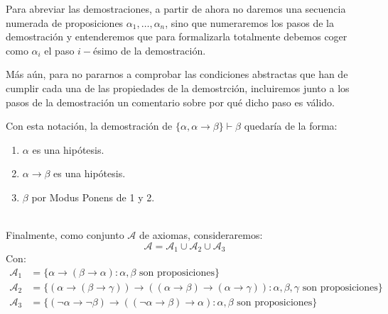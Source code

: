 \begin{notacion}
    Para abreviar las demostraciones, a partir de ahora no daremos una secuencia numerada de proposiciones $\alpha_1,\ldots,\alpha_n$, sino que numeraremos los pasos de la demostración y entenderemos que para formalizarla totalmente debemos coger como $\alpha_i$ el paso $i-$ésimo de la demostración.

    Más aún, para no pararnos a comprobar las condiciones abstractas que han de cumplir cada una de las propiedades de la demostrción, incluiremos junto a los pasos de la demostración un comentario sobre por qué dicho paso es válido.

    Con esta notación, la demostración de $\{\alpha,\alpha\to\beta\}\vdash \beta$ quedaría de la forma:
    \begin{enumerate}
        \item $\alpha$ es una hipótesis.
        \item $\alpha\to\beta$ es una hipótesis.
        \item $\beta$ por Modus Ponens de 1 y 2.
    \end{enumerate}
\end{notacion}~\\

\noindent
Finalmente, como conjunto $\mathcal{A}$ de axiomas, consideraremos:
\begin{equation*}
    \mathcal{A} = \mathcal{A}_1 \cup \mathcal{A}_2 \cup \mathcal{A}_3
\end{equation*}
Con:
\begin{align*}
    \mathcal{A}_1 &= \{\alpha\to(\beta\to\alpha) : \alpha,\beta \text{\ son proposiciones}\} \\
    \mathcal{A}_2 &= \{(\alpha\to(\beta\to\gamma))\to((\alpha\to\beta)\to(\alpha\to\gamma)) : \alpha,\beta,\gamma \text{\ son proposiciones}\} \\
    \mathcal{A}_3 &= \{(\lnot\alpha\to\lnot\beta)\to((\lnot\alpha\to\beta)\to\alpha) : \alpha,\beta \text{\ son proposiciones}\}
\end{align*}

